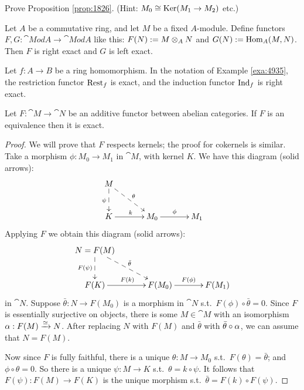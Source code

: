 \begin{exer} \label{exer:1826}
Prove Proposition \ref{prop:1826}. (Hint: $M_0 \cong \operatorname{Ker}(M_1 \to M_2)$ 
etc.)
\end{exer}

\begin{exa} \label{exa:4680}
Let $A$ be a commutative ring, and let $M$ be a fixed $A$-module. 
Define functors 
$F, G : \cat{Mod} A \to \cat{Mod} A$ like this:
$F(N) := M \otimes_A N$ and $G(N) := \operatorname{Hom}_A(M, N)$.
Then $F$ is right exact and $G$ is left exact.
\end{exa}

\begin{exa} \label{exa:4681}
Let $f : A \to B$ be a ring homomorphism. 
In the notation of Example \ref{exa:4935}, the restriction functor 
$\operatorname{Rest}_f$ is exact, and the induction functor
$\operatorname{Ind}_f$ is right exact. 
\end{exa}

\begin{prop}
Let $F : \cat{M} \to \cat{N}$ be an additive functor between abelian
categories. If $F$ is an equivalence then it is exact.
\end{prop}

\begin{proof}
We will prove that $F$ respects kernels; the proof for cokernels is similar.
Take a morphism $\phi : M_0 \to M_1$ in $\cat{M}$, with kernel $K$. 
We have this diagram (solid arrows):
\[ \UseTips  \xymatrix @C=8ex @R=6ex {
M 
\ar@{-->}[d]_{\psi}
\ar@{-->}[dr]^{\theta}
\\
K
\ar[r]^{k}
& 
M_0
\ar[r]^{\phi}
&
M_1
} \]
Applying $F$ we obtain 
 this diagram (solid arrows):
\[ \UseTips  \xymatrix @C=8ex @R=6ex {
N = F(M)
\ar@{-->}[d]_{F(\psi)}
\ar@{-->}[dr]^{\bar{\theta}}
\\
F(K)
\ar[r]^{F(k)}
& 
F(M_0)
\ar[r]^{F(\phi)}
&
F(M_1)
} \]
in $\cat{N}$. 
Suppose $\bar{\theta} : N \to F(M_0)$ is a morphism in $\cat{N}$ s.t.\ 
$F(\phi) \circ \bar{\theta} = 0$.
Since $F$ is essentially surjective on objects, there is some $M \in \cat{M}$
with an isomorphism $\alpha : F(M) \xrightarrow{\simeq} N$. After replacing $N$ with $F(M)$ and 
$\bar{\theta}$ with $\bar{\theta} \circ \alpha$, we can assume that  
$N = F(M)$. 

Now since $F$ is fully faithful, there is a unique $\theta : M \to M_0$ s.t.\ 
$F(\theta) = \bar{\theta}$; and $\phi \circ \theta = 0$. 
So there is a unique $\psi : M \to K$ s.t.\  
$\theta = k \circ \psi$. It follows that 
$F(\psi) : F(M) \to F(K)$ is the unique morphism s.t.\ 
$\bar{\theta} = F(k) \circ F(\psi)$.
\end{proof}

